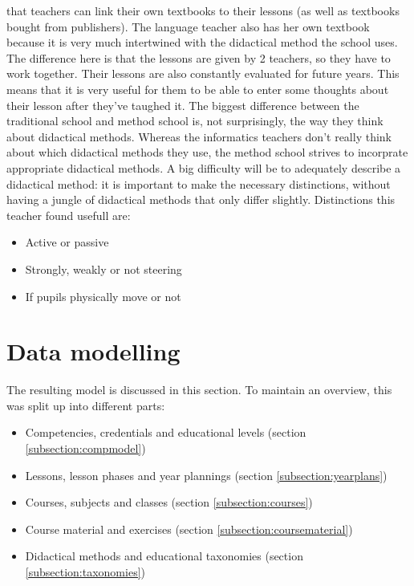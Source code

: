 \documentclass[a4paper]{report}
\begin{document}
    that teachers can link their own textbooks to their lessons (as well as textbooks bought from publishers).
    The language teacher also has her own textbook because it is very much intertwined with the didactical method the school uses.
    The difference here is that the lessons are given by 2 teachers, so they have to work together. Their lessons are also constantly evaluated for future years.
    This means that it is very useful for them to be able to enter some thoughts about their lesson after they've taughed it.
    The biggest difference between the traditional school and method school is, not surprisingly, the way they think about didactical methods.
    Whereas the informatics teachers don't really think about which didactical methods they use, the method school strives to incorprate appropriate didactical methods.
    A big difficulty will be to adequately describe a didactical method: it is important to make the necessary distinctions, without having a jungle of didactical methods that only differ slightly.
    Distinctions this teacher found usefull are:
    \begin{itemize}
        \item Active or passive
        \item Strongly, weakly or not steering
        \item If pupils physically move or not
    \end{itemize}

    \chapter{Data modelling}
    \label{section:datamodelling}

    The resulting model is discussed in this section. To maintain an overview, this was split up into different parts:
    \begin{itemize}
        \item Competencies, credentials and educational levels (section \ref{subsection:compmodel})
        \item Lessons, lesson phases and year plannings (section \ref{subsection:yearplans})
        \item Courses, subjects and classes (section \ref{subsection:courses})
        \item Course material and exercises (section \ref{subsection:coursematerial})
        \item Didactical methods and educational taxonomies (section \ref{subsection:taxonomies})
    \end{itemize}
\end{document}
